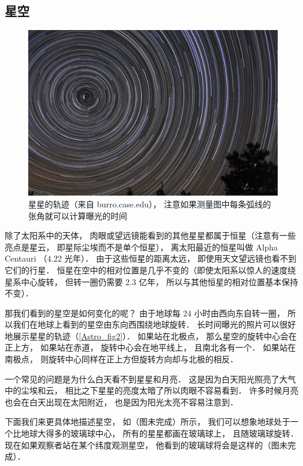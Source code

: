 \subsection{星空}

\begin{figure}[ht]
\centering
\includegraphics[width=14cm]{./figures/Astro2.pdf}
\caption{星星的轨迹（来自 burro.case.edu）， 注意如果测量图中每条弧线的张角就可以计算曝光的时间} \label{Astro_fig2}
\end{figure}

除了太阳系中的天体， 肉眼或望远镜能看到的其他星星都属于恒星（注意有一些亮点是星云， 即星际尘埃而不是单个恒星）， 离太阳最近的恒星叫做 Alpha Centauri （4.22 光年）． 由于这些恒星的距离太远， 即使用天文望远镜也看不到它们的行星． 恒星在空中的相对位置是几乎不变的（即使太阳系以惊人的速度绕星系中心旋转， 但转一圈仍需要 2.3 亿年， 所以与其他恒星的相对位置基本保持不变）．

那我们看到的星空是如何变化的呢？ 由于地球每 24 小时由西向东自转一圈， 所以我们在地球上看到的星空由东向西围绕地球旋转． 长时间曝光的照片可以很好地展示星星的轨迹（\autoref{Astro_fig2}）． 如果站在北极点， 那么星空的旋转中心会在正上方， 如果站在赤道， 旋转中心会在地平线上， 且南北各有一个． 如果站在南极点， 则旋转中心同样在正上方但旋转方向却与北极的相反．

一个常见的问题是为什么白天看不到星星和月亮． 这是因为白天阳光照亮了大气中的尘埃和云， 相比之下星星的亮度太暗了所以肉眼不容易看到． 许多时候月亮也会在白天出现在太阳附近， 也是因为阳光太亮不容易注意到．

下面我们来更具体地描述星空， 如（图未完成）所示， 我们可以想象地球处于一个比地球大得多的玻璃球中心， 所有的星星都画在玻璃球上， 且随玻璃球旋转． 现在如果观察者站在某个纬度观测星空， 他看到的玻璃球将会是这样的（图未完成）．



